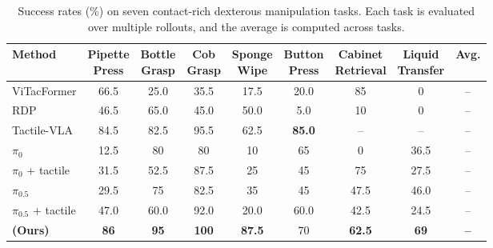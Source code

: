 \begin{table}[t]
\centering
\caption{Success rates (\%) on seven contact-rich dexterous manipulation tasks. Each task is evaluated over multiple rollouts, and the average is computed across tasks.}
\label{tab:main_results}
\small
\setlength{\tabcolsep}{4pt}
\begin{tabular*}{\textwidth}{@{\extracolsep{\fill}}lcccccccc}
\toprule
\textbf{Method}
& \shortstack{\textbf{Pipette}\\\textbf{Press}}
& \shortstack{\textbf{Bottle}\\\textbf{Grasp}}
& \shortstack{\textbf{Cob}\\\textbf{Grasp}}
& \shortstack{\textbf{Sponge}\\\textbf{Wipe}}
& \shortstack{\textbf{Button}\\\textbf{Press}}
& \shortstack{\textbf{Cabinet}\\\textbf{Retrieval}}
& \shortstack{\textbf{Liquid}\\\textbf{Transfer}}
& \textbf{Avg.} \\
\midrule
ViTacFormer
& 66.5 & 25.0 & 35.5 & 17.5 & 20.0 & 85 & 0 & -- \\
RDP
& 46.5 & 65.0 & 45.0 & 50.0 & 5.0 & 10 & 0 & -- \\
Tactile-VLA
& 84.5 & 82.5 & 95.5 & 62.5 & \textbf{85.0} & -- & -- & -- \\
$\pi_{0}$
& 12.5 & 80 & 80 & 10 & 65 & 0 & 36.5 & -- \\
$\pi_{0}$ + tactile
& 31.5 & 52.5 & 87.5 & 25 & 45 & 75 & 27.5 & -- \\
$\pi_{0.5}$
& 29.5 & 75 & 82.5 & 35 & 45 & 47.5 & 46.0 & -- \\
$\pi_{0.5}$ + tactile
& 47.0 & 60.0 & 92.0 & 20.0 & 60.0 & 42.5 & 24.5 & -- \\
\midrule
\textbf{\systemname{} (Ours)}
& \textbf{86}
& \textbf{95}
& \textbf{100}
& \textbf{87.5}
& 70
& \textbf{62.5}
& \textbf{69}
& \textbf{--} \\
\bottomrule
\end{tabular*}
\end{table}
